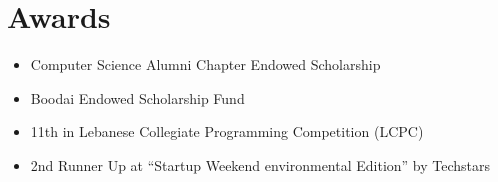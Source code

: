 \documentclass[letterpaper,11pt]{article}
\newcommand{\resumeItem}[2]{
  \item\small{
    \textbf{#1}{ #2 \vspace{-2pt}}
  }
}
\newcommand{\resumeSubItem}[2]{\resumeItem{#1}{#2}\vspace{-4pt}}
\newcommand{\resumeSubHeadingListStart}{\begin{itemize}[leftmargin=*]}
\newcommand{\resumeSubHeadingListEnd}{\end{itemize}}
\begin{document}
%

\section{Awards}
  \resumeSubHeadingListStart
    \resumeSubItem{}
      {Computer Science Alumni Chapter Endowed Scholarship}
    \resumeSubItem{}
      {Boodai Endowed Scholarship Fund}
    \resumeSubItem{}
      {11th in Lebanese Collegiate Programming Competition (LCPC)}
    \resumeSubItem{}
      {2nd Runner Up at “Startup Weekend environmental Edition” by Techstars}
  \resumeSubHeadingListEnd  
\end{document}
